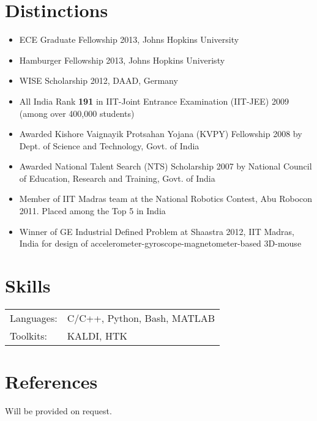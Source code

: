 \documentclass[margin,line,pifont,palatino,courier]{res}
\begin{document}
\begin{resume}
\section{\sc Distinctions}
\begin{itemize} \itemsep -2pt
    \item ECE Graduate Fellowship 2013, Johns Hopkins University
    \item Hamburger Fellowship 2013, Johns Hopkins Univeristy
    \item WISE Scholarship 2012, DAAD, Germany
    \item All India Rank \textbf{191} in {IIT-Joint Entrance Examination (IIT-JEE)} 2009 (among over 400,000 students) 
    \item Awarded Kishore Vaignayik Protsahan Yojana (KVPY) Fellowship 2008 by Dept. of Science and Technology, Govt. of India
    \item Awarded National Talent Search (NTS) Scholarship 2007 by National Council of Education, Research and Training, Govt. of India
    \item Member of IIT Madras team at the National Robotics Contest, Abu Robocon 2011. Placed among the Top 5 in India
    \item Winner of GE Industrial Defined Problem at Shaastra 2012, IIT Madras, India for design of accelerometer-gyroscope-magnetometer-based 3D-mouse
  \end{itemize}

\section{\sc Skills}

\begin{tabular}{@{}p{0.8in}p{6in}}

Languages:& C/C++, Python, Bash, MATLAB\\
Toolkits: & KALDI, HTK \\

\end{tabular}

\section{\sc References}

Will be provided on request.

\end{resume}
\end{document}
